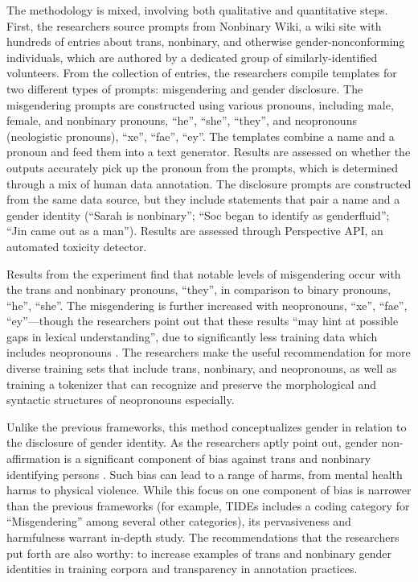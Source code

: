 \documentclass[anonymous,review]{acmart}
\begin{document}
The methodology is mixed, involving both qualitative and quantitative steps. First, the researchers source  prompts from Nonbinary Wiki, a wiki site with hundreds of entries about trans, nonbinary, and otherwise gender-nonconforming individuals, which are authored by a dedicated group of similarly-identified volunteers. From the collection of entries, the researchers compile templates for two different types of prompts: misgendering and gender disclosure. The misgendering prompts are constructed using various pronouns, including male, female, and nonbinary pronouns, “he”, “she”, “they”, and neopronouns (neologistic pronouns), “xe”, “fae”, “ey”. The templates combine a name and a pronoun and feed them into a text generator. Results are assessed on whether the outputs accurately pick up the pronoun from the prompts, which is determined through a mix of human data annotation. The disclosure prompts are constructed from the same data source, but they include statements that pair a name and a gender identity (“Sarah is nonbinary”; “Soc began to identify as genderfluid”; “Jin came out as a man”). Results are assessed through Perspective API, an automated toxicity detector.

Results from the experiment find that notable levels of misgendering occur with the trans and nonbinary pronouns, “they”, in comparison to binary pronouns, “he”, “she”. The misgendering is further increased with neopronouns, “xe”, “fae”, “ey”—though the researchers point out that these results “may hint at possible gaps in lexical understanding”, due to significantly less training data which includes neopronouns \citep{ovalle:2023}. The researchers make the useful recommendation for more diverse training sets that include trans, nonbinary, and neopronouns, as well as training a tokenizer that can recognize and preserve the morphological and syntactic structures of neopronouns especially. 

Unlike the previous frameworks, this method conceptualizes gender in relation to the disclosure of gender identity. As the researchers aptly point out, gender non-affirmation is a significant component of bias against trans and nonbinary identifying persons \citep{ovalle:2023}. Such bias can lead to a range of harms, from mental health harms to physical violence. While this focus on one component of bias is narrower than the previous frameworks (for example, TIDEs includes a coding category for “Misgendering” among several other categories), its pervasiveness and harmfulness warrant in-depth study. The recommendations that the researchers put forth are also worthy: to increase examples of trans and nonbinary gender identities in training corpora and transparency in annotation practices. 
\end{document}
